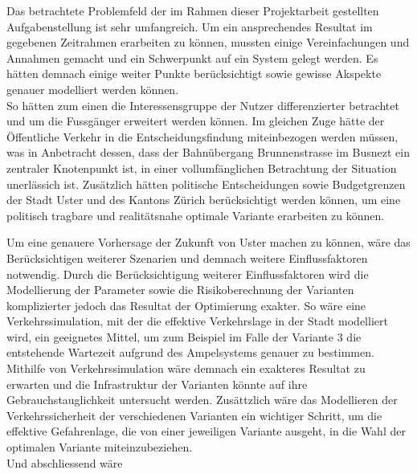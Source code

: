 Das betrachtete Problemfeld der im Rahmen dieser Projektarbeit gestellten Aufgabenstellung ist sehr umfangreich. Um ein ansprechendes Resultat im gegebenen Zeitrahmen erarbeiten zu können, mussten einige Vereinfachungen und Annahmen gemacht und ein Schwerpunkt auf ein System gelegt werden. Es hätten demnach einige weiter Punkte berücksichtigt sowie gewisse Akspekte genauer modelliert werden können. \\
So hätten zum einen die Interessensgruppe der Nutzer differenzierter betrachtet und um die Fussgänger erweitert werden können. Im gleichen Zuge hätte der Öffentliche Verkehr in die Entscheidungsfindung miteinbezogen werden müssen, was in Anbetracht dessen, dass der Bahnübergang Brunnenstrasse im Busnezt ein zentraler Knotenpunkt ist, in einer vollumfänglichen Betrachtung der Situation unerlässich ist. Zusätzlich hätten politische Entscheidungen sowie Budgetgrenzen der Stadt Uster und des Kantons Zürich berücksichtigt werden können, um eine politisch tragbare und realitätsnahe optimale Variante erarbeiten zu können.

Um eine genauere Vorhersage der Zukunft von Uster machen zu können, wäre das Berücksichtigen weiterer Szenarien und demnach weitere Einflussfaktoren notwendig. Durch die Berücksichtigung weiterer Einflussfaktoren wird die Modellierung der Parameter sowie die Risikoberechnung der Varianten komplizierter jedoch das Resultat der Optimierung exakter. 
So wäre eine Verkehrssimulation, mit der die effektive Verkehrslage in der Stadt modelliert wird, ein geeignetes Mittel, um zum Beispiel im Falle der Variante 3 die entstehende Wartezeit aufgrund des Ampelsystems genauer zu bestimmen. Mithilfe von Verkehrssimulation wäre demnach ein exakteres Resultat zu erwarten und die Infrastruktur der Varianten könnte auf ihre Gebrauchstauglichkeit untersucht werden. Zusättzlich wäre das Modellieren der Verkehrssicherheit der verschiedenen Varianten ein wichtiger Schritt, um die effektive Gefahrenlage, die von einer jeweiligen Variante ausgeht, in die Wahl der optimalen Variante miteinzubeziehen.\\
Und abschliessend wäre 
  



%

